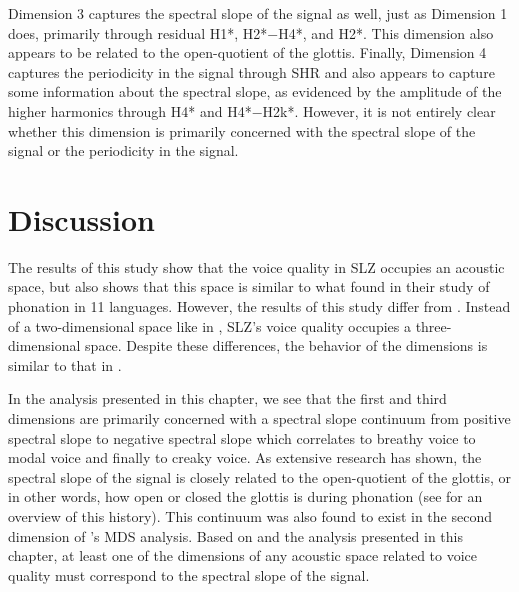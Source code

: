 Dimension 3 captures the spectral slope of the signal as well, just as Dimension 1 does, primarily through residual H1*, H2*$-$H4*, and H2*. This dimension also appears to be related to the open-quotient of the glottis. Finally, Dimension 4 captures the periodicity in the signal through SHR and also appears to capture some information about the spectral slope, as evidenced by the amplitude of the higher harmonics through H4* and H4*$-$H2k*. However, it is not entirely clear whether this dimension is primarily concerned with the spectral slope of the signal or the periodicity in the signal.

\section{Discussion} \label{sec:acousticlandscape:discussion}

The results of this study show that the voice quality in SLZ occupies an acoustic space, but also shows that this space is similar to what \citet{keatingCrosslanguageAcousticSpace2023} found in their study of phonation in 11 languages. However, the results of this study differ from \citet{keatingCrosslanguageAcousticSpace2023}. Instead of a two-dimensional space like in \citet{keatingCrosslanguageAcousticSpace2023}, SLZ's voice quality occupies a three-dimensional space. Despite these differences, the behavior of the dimensions is similar to that in \citet{keatingCrosslanguageAcousticSpace2023}. 

In the analysis presented in this chapter, we see that the first and third dimensions are primarily concerned with a spectral slope continuum from positive spectral slope to negative spectral slope which correlates to breathy voice to modal voice and finally to creaky voice. As extensive research has shown, the spectral slope of the signal is closely related to the open-quotient of the glottis, or in other words, how open or closed the glottis is during phonation (see \citet{garellekTheoreticalAchievementsPhonetics2022} for an overview of this history). This continuum was also found to exist in the second dimension of \citeauthor{keatingCrosslanguageAcousticSpace2023}'s \citeyear{keatingCrosslanguageAcousticSpace2023} MDS analysis. Based on \citet{keatingCrosslanguageAcousticSpace2023} and the analysis presented in this chapter, at least one of the dimensions of any acoustic space related to voice quality must correspond to the spectral slope of the signal. 

